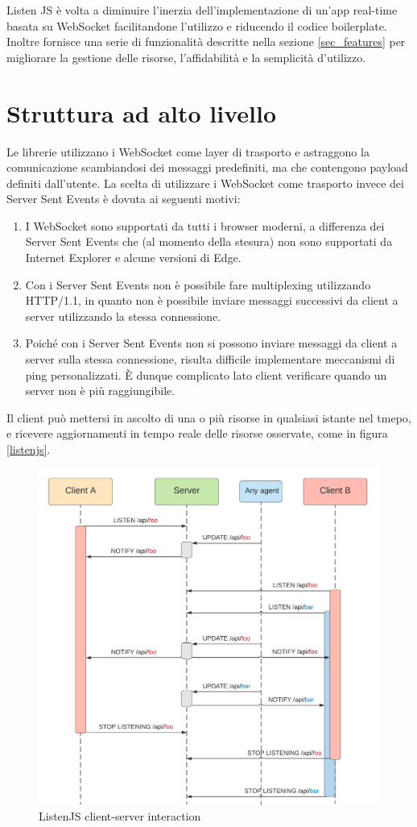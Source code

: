 \documentclass[12pt,a4paper,openright]{report}
\begin{document}
\bigskip

Listen JS è volta a diminuire l'inerzia dell'implementazione di un'app real-time basata su WebSocket facilitandone l'utilizzo e riducendo il codice boilerplate. Inoltre fornisce una serie di funzionalità descritte nella sezione \ref{sec_features} per migliorare la gestione delle risorse, l'affidabilità e la semplicità d'utilizzo.
\section{Struttura ad alto livello}\label{sec_struttura_alto_livello}
Le librerie utilizzano i WebSocket come layer di trasporto e astraggono la comunicazione scambiandosi dei messaggi predefiniti, ma che contengono payload definiti dall'utente.
La scelta di utilizzare i WebSocket come trasporto invece dei Server Sent Events è dovuta ai seguenti motivi:
\begin{enumerate}
\item I WebSocket sono supportati da tutti i browser moderni, a differenza dei Server Sent Events che (al momento della stesura) non sono supportati da Internet Explorer e alcune versioni di Edge.
\item Con i Server Sent Events non è possibile fare multiplexing utilizzando HTTP/1.1, in quanto non è possibile inviare messaggi successivi da client a server utilizzando la stessa connessione.
\item Poiché con i Server Sent Events non si possono inviare messaggi da client a server sulla stessa connessione, risulta difficile implementare meccanismi di ping personalizzati. È dunque complicato lato client verificare quando un server non è più raggiungibile.
\end{enumerate}
Il client può mettersi in ascolto di una o più risorse in qualsiasi istante nel tmepo, e ricevere aggiornamenti in tempo reale delle risorse osservate, come in figura \ref{listenjs}.
\begin{figure}[!htbp]
\centering
\includegraphics[width=.5\textwidth]{assets/listenjs.png}
\caption{ListenJS client-server interaction}
\label{fig:listenjs}
\end{figure}
\end{document}
